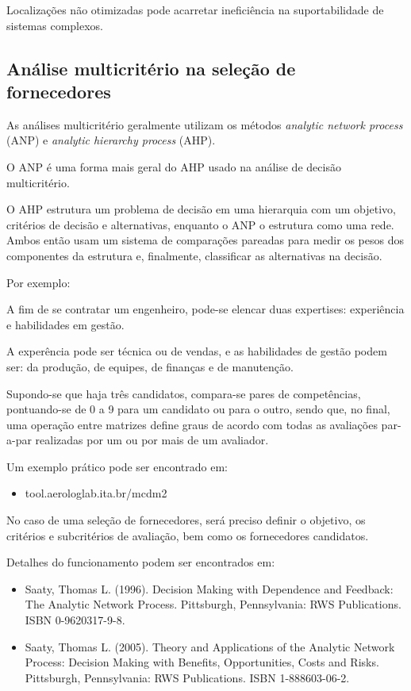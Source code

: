 \documentclass{amsart}
\begin{document}
Localizações não otimizadas pode acarretar ineficiência na suportabilidade de sistemas complexos.

\subsection{Análise multicritério na seleção de fornecedores}

As análises multicritério geralmente utilizam os métodos {\it analytic network process} (ANP) e {\it analytic hierarchy process} (AHP).

O ANP é uma forma mais geral do AHP usado na análise de decisão multicritério.

O AHP estrutura um problema de decisão em uma hierarquia com um objetivo, critérios de decisão e alternativas, enquanto o ANP o estrutura como uma rede. Ambos então usam um sistema de comparações pareadas para medir os pesos dos componentes da estrutura e, finalmente, classificar as alternativas na decisão.

Por exemplo:

A fim de se contratar um engenheiro, pode-se elencar duas expertises: experiência e habilidades em gestão.

A experência pode ser técnica ou de vendas, e as habilidades de gestão podem ser: da produção, de equipes, de finanças e de manutenção.

Supondo-se que haja três candidatos, compara-se pares de competências, pontuando-se de 0 a 9 para um candidato ou para o outro, sendo que, no final, uma operação entre matrizes define graus de acordo com todas as avaliações par-a-par realizadas por um ou por mais de um avaliador.

Um exemplo prático pode ser encontrado em:

\begin{itemize}
\item tool.aerologlab.ita.br/mcdm2
\end{itemize}

No caso de uma seleção de fornecedores, será preciso definir o objetivo, os critérios e subcritérios de avaliação, bem como os fornecedores candidatos.

Detalhes do funcionamento podem ser encontrados em:

\begin{itemize}
\item Saaty, Thomas L. (1996). Decision Making with Dependence and Feedback: The Analytic Network Process. Pittsburgh, Pennsylvania: RWS Publications. ISBN 0-9620317-9-8.

\item Saaty, Thomas L. (2005). Theory and Applications of the Analytic Network Process: Decision Making with Benefits, Opportunities, Costs and Risks. Pittsburgh, Pennsylvania: RWS Publications. ISBN 1-888603-06-2.
\end{itemize}
\end{document}
